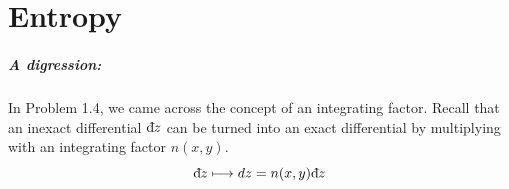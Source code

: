\chapter{Entropy}
\label{ch:Chapter2}
    \begin{tcolorbox}
        \paragraph{A digression:} In Problem 1.4, we came across the concept of an integrating factor. Recall that an inexact differential $\text{d}\hspace*{-0.13em}\bar{}\hspace*{0.1em} z$ can be turned into an exact differential by multiplying with an integrating factor $n(x,y)$. 
        \begin{equation}
            \text{d}\hspace*{-0.13em}\bar{}\hspace*{0.1em} z \longmapsto dz = n(x,y)\text{d}\hspace*{-0.13em}\bar{}\hspace*{0.1em} z
        \end{equation}
    \end{tcolorbox}
    
